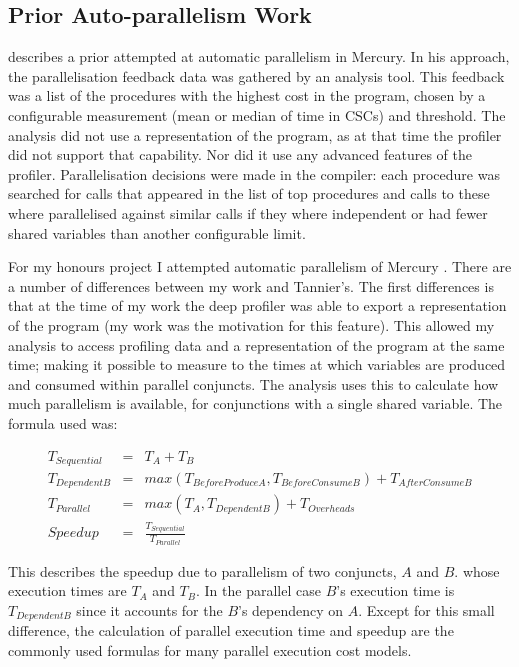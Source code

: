 \subsection{Prior Auto-parallelism Work}

\citet{tannier:2007:parallel_mercury} describes a prior attempted at automatic
parallelism in Mercury.
In his approach, the parallelisation feedback data was gathered by an analysis
tool.
This feedback was a list of the procedures with the highest cost in the program,
chosen by a configurable measurement (mean or median of time in CSCs) and threshold.
The analysis did not use a representation of the program,
as at that time the profiler did not support that capability.
Nor did it use any advanced features of the profiler.
Parallelisation decisions were made in the compiler:
each procedure was searched for calls that appeared in the list of top procedures
and calls to these where parallelised against similar calls if they
where independent or had fewer shared variables than another configurable limit.

For my honours project I attempted automatic parallelism of Mercury
\citep{bone:2008:hons}.
There are a number of differences between my work and Tannier's.
The first differences is that at the time of my work the deep profiler
was able to export a representation of the program
(my work was the motivation for this feature).
This allowed my analysis to access profiling data and a representation
of the program at the same time;
making it possible to measure to the times at which variables are produced
and consumed within parallel conjuncts.
The analysis uses this to calculate how much parallelism is available,
for conjunctions with a single shared variable.
The formula used was:

\begin{eqnarray*}
T_{Sequential} & = & T_A + T_B \\
T_{DependentB} & = & max(T_{BeforeProduceA}, T_{BeforeConsumeB}) +
T_{AfterConsumeB} \\
T_{Parallel} & = & max(T_A, T_{DependentB}) + T_{Overheads} \\
Speedup & = & \frac{T_{Sequential}}{T_{Parallel}}
\end{eqnarray*}

This describes the speedup due to parallelism of two conjuncts, $A$ and $B$.
whose execution times are $T_A$ and $T_B$.
In the parallel case $B$'s execution time is $T_{DependentB}$ since it
accounts for the $B$'s dependency on $A$.
Except for this small difference,
the calculation of parallel execution time and speedup are the commonly
used formulas for many parallel execution cost models.

